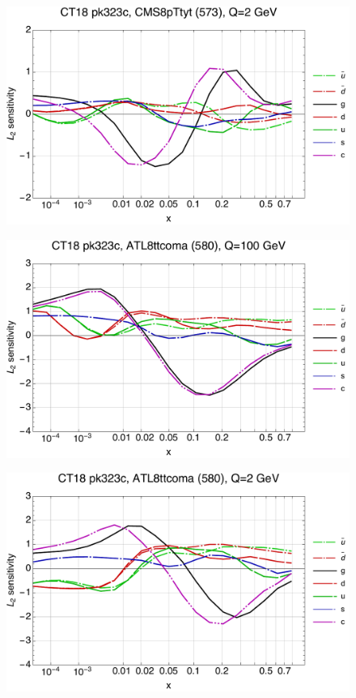 \documentclass[10pt,aps,prd,floatfix,titlepage]{revtex4}
\begin{document}
\begin{figure}
\includegraphics[width=\textwidth,height=0.44\textheight,keepaspectratio]{1/573_ct18nn_L2_q2_Sf_1.pdf}
\caption{}
\end{figure}
\clearpage
\begin{figure}
\includegraphics[width=\textwidth,height=0.44\textheight,keepaspectratio]{1/580_ct18nn_L2_q100_Sf_1.pdf}
\caption{}
\end{figure}
\begin{figure}
\includegraphics[width=\textwidth,height=0.44\textheight,keepaspectratio]{1/580_ct18nn_L2_q2_Sf_1.pdf}
\caption{}
\end{figure}
\end{document}
